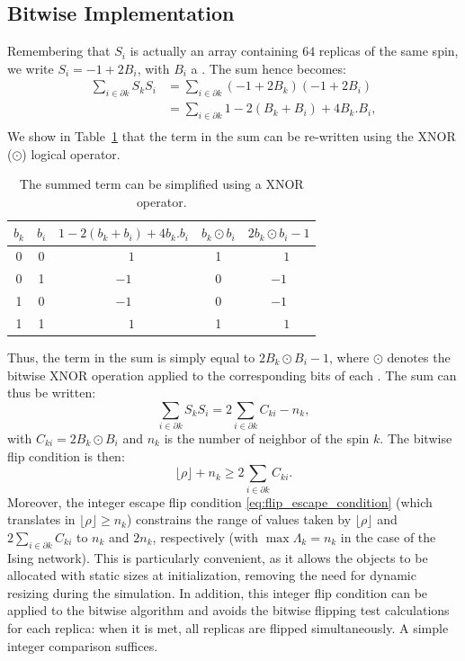 \subsection{Bitwise Implementation}
Remembering that $S_i$ is actually an array containing $64$ replicas of the same spin, we write $S_i = -1 + 2B_i$, with $B_i$ a \Bits. The sum hence becomes:
\begin{equation*}
\begin{aligned}
  \sum_{i \in \partial k}S_k S_i&=\sum_{i \in \partial k} (-1+2B_k)(-1+2B_i)\\
                          &=\sum_{i \in \partial k} 1-2 (B_k+B_i) +4 B_k.B_i,\\
\end{aligned}
\end{equation*}
We show in Table~\ref{tab:XNOR} that the term in the sum can be re-written using the XNOR ($\odot$) logical operator.
\begin{table}[h]
\centering
\begin{tabular}{cc||c|c|c}
\hline
$b_k$ & $b_i$ & $1- 2 (b_k+b_i) +4 b_k.b_i$ &  ${b_k \odot b_i}$ & $2{b_k \odot b_i} -1 $ \\
\hline
0 & 0 & $ \phantom{-}1$ & 1 & $\phantom{-}1$ \\
0 & 1 & $-1$ & 0  & $-1$ \\
1 & 0 & $-1$ & 0 &  $-1$ \\
1 & 1 & $\phantom{-}1$ & 1 & $\phantom{-}1$\\
\hline
\end{tabular}
\caption{The summed term can be simplified using a XNOR operator.}
\label{tab:XNOR}
\end{table}
Thus, the term in the sum is simply equal to $2{B_k \odot B_i} -1 $, where $\odot$ denotes the bitwise XNOR operation applied to the corresponding bits of each \Bits. The sum can thus be written:
\begin{equation*}
  \sum_{i \in \partial k}S_k S_i=2\sum_{i \in \partial k} C_{ki} - n_k,
\end{equation*}
with $C_{ki}=2{B_k \odot B_i}$ and $n_k$ is the number of neighbor of the spin $k$. The bitwise flip condition is then:
\begin{equation}
  \lfloor \rho \rfloor + n_k \geq 2 \sum_{i \in \partial k}C_{ki}.
  \label{eq:flip_ising_bitwise}
\end{equation}
 Moreover, the integer escape flip condition \eqref{eq:flip_escape_condition} (which translates in $\lfloor \rho \rfloor \geq n_k$) constrains the range of values taken by $\lfloor \rho \rfloor$ and $ 2 \sum_{i \in \partial k}C_{ki}$ to $n_k$ and $2n_k$, respectively (with $\max \Lambda_k = n_k$ in the case of the Ising network). This is particularly convenient, as it allows the \UnsignedInt objects to be allocated with static sizes at initialization, removing the need for dynamic resizing during the simulation.
 In addition, this integer flip condition can be applied to the bitwise algorithm and avoids the bitwise flipping test calculations for each replica: when it is met, all replicas are flipped simultaneously. A simple integer comparison suffices.\\

